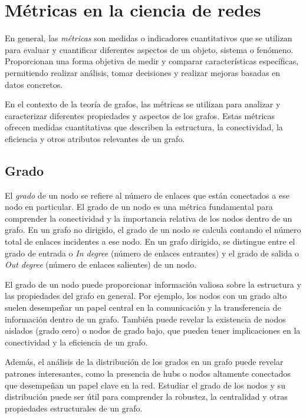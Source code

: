 \section{Métricas en la ciencia de redes}

En general, las \textit{métricas} son medidas o indicadores cuantitativos que se utilizan para evaluar
y cuantificar diferentes aspectos de un objeto, sistema o fenómeno. Proporcionan una forma objetiva de medir y
comparar características específicas, permitiendo realizar análisis, tomar decisiones y realizar
mejoras basadas en datos concretos.

En el contexto de la teoría de grafos, las métricas se utilizan para analizar y caracterizar diferentes
propiedades y aspectos de los grafos. Estas métricas ofrecen medidas cuantitativas que describen la
estructura, la conectividad, la eficiencia y otros atributos relevantes de un grafo.

\subsection{Grado}

El \textit{grado} de un nodo se refiere al número de enlaces que están conectados a ese nodo
en particular. El grado de un nodo es una métrica fundamental para comprender la conectividad 
y la importancia relativa de los nodos dentro de un grafo. En un grafo no dirigido, el grado 
de un nodo se calcula contando el número total de enlaces incidentes a ese nodo. En un grafo 
dirigido, se distingue entre el grado de entrada o \textit{In degree} (número de enlaces entrantes) 
y el grado de salida o \textit{Out degree} (número de enlaces salientes) de un nodo.

El grado de un nodo puede proporcionar información valiosa sobre la estructura y las propiedades
del grafo en general. Por ejemplo, los nodos con un grado alto suelen desempeñar un papel central
en la comunicación y la transferencia de información dentro de un grafo. También puede revelar la
existencia de nodos aislados (grado cero) o nodos de grado bajo, que pueden tener implicaciones
en la conectividad y la eficiencia de un grafo.

Además, el análisis de la distribución de los grados en un grafo puede revelar patrones interesantes,
como la presencia de hubs o nodos altamente conectados que desempeñan un papel clave en la red.
Estudiar el grado de los nodos y su distribución puede ser útil para comprender la robustez,
la centralidad y otras propiedades estructurales de un grafo.

